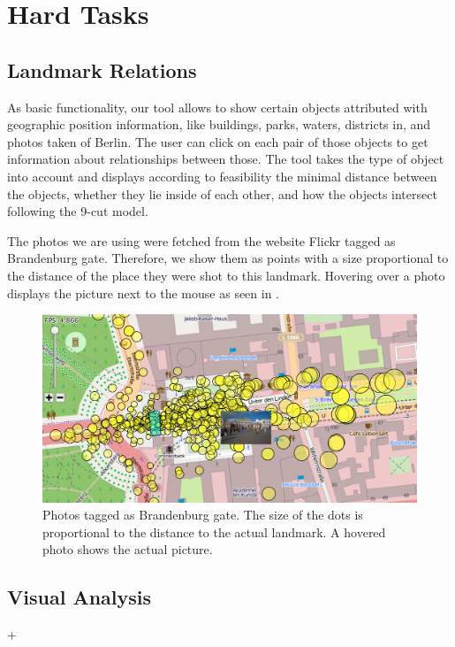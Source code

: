 \section*{Hard Tasks}

\subsection*{Landmark Relations}

As basic functionality, our tool allows to show certain objects attributed with
geographic position information, like buildings, parks, waters, districts in, and
photos taken of Berlin.
The user can click on each pair of those objects to get information about
relationships between those.
The tool takes the type of object into account and displays according
to feasibility the minimal distance between the objects, whether they lie
inside of each other, and how the objects intersect following the 9-cut model.

The photos we are using were fetched from the website Flickr tagged
as Brandenburg gate.
Therefore, we show them as points with a size proportional to
the distance of the place they were shot to this landmark.
Hovering over a photo displays the picture next to the mouse
as seen in .

\begin{figure}[h]
\centering
\includegraphics[width=0.9\linewidth]{imgs/brand}
\caption{Photos tagged as Brandenburg gate. The size of the dots
is proportional to the distance to the actual landmark.
A hovered photo shows the actual picture.}
\label{fig:brandenburg}
\end{figure}

\subsection*{Visual Analysis}

\todo{}

+

